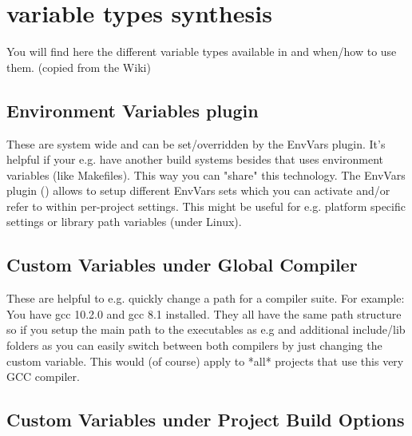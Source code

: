 \section{\codeblocks variable types synthesis}\label{sec:cb_variables_types}

You will find here the different variable types available in \codeblocks and when/how to use them. (copied from the Wiki)

\subsection{Environment Variables plugin}

These are system wide and can be set/overridden by the EnvVars plugin.
It's helpful if your e.g. have another build systems besides \codeblocks that uses environment variables (like Makefiles). This way you can "share" this technology.
The EnvVars plugin () allows to setup different EnvVars sets which you can activate and/or refer to within per-project settings.
This might be useful for e.g. platform specific settings or library path variables (under Linux). 

\subsection{Custom Variables under Global Compiler}

These are helpful to e.g. quickly change a path for a compiler suite.
For example: You have gcc 10.2.0 and gcc 8.1 installed. They all have the same path structure so if you setup the main path to the executables as e.g  
and additional include/lib  folders as you can easily switch between both compilers by just changing the custom variable. 
This would (of course) apply to *all* projects that use this very GCC compiler. 

\subsection{Custom Variables under Project Build Options}


